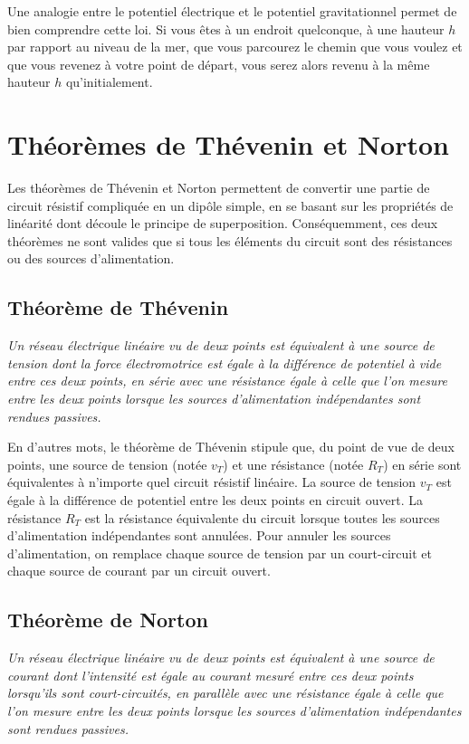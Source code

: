 \documentclass[12pt,oneside,letterpaper]{article}
\begin{document}
Une analogie entre le potentiel électrique et le potentiel gravitationnel permet de bien comprendre cette loi. Si vous êtes à un endroit quelconque, à une hauteur $h$ par rapport au niveau de la mer, que vous parcourez le chemin que vous voulez et que vous revenez à votre point de départ, vous serez alors revenu à la même hauteur $h$ qu'initialement.


\section{Théorèmes de Thévenin et Norton}

Les théorèmes de Thévenin et Norton permettent de convertir une partie de circuit résistif compliquée en un dipôle simple, en se basant sur les propriétés de linéarité dont découle le principe de superposition. Conséquemment, ces deux théorèmes ne sont valides que si tous les éléments du circuit sont des résistances ou des sources d'alimentation.


\subsection{Théorème de Thévenin}

\emph{Un réseau électrique linéaire vu de deux points est équivalent à une source de tension dont la force électromotrice est égale à la différence de potentiel à vide entre ces deux points, en série avec une résistance égale à celle que l'on mesure entre les deux points lorsque les sources d'alimentation indépendantes sont rendues passives.}

En d'autres mots, le théorème de Thévenin stipule que, du point de vue de deux points, une source de tension (notée $v_T$) et une résistance (notée $R_T$) en série sont équivalentes à n'importe quel circuit résistif linéaire. La source de tension $v_T$ est égale à la différence de potentiel entre les deux points en circuit ouvert. La résistance $R_T$ est la résistance équivalente du circuit lorsque toutes les sources d'alimentation indépendantes sont annulées. Pour annuler les sources d'alimentation, on remplace chaque source de tension par un court-circuit et chaque source de courant par un circuit ouvert.


\subsection{Théorème de Norton}

\emph{Un réseau électrique linéaire vu de deux points est équivalent à une source de courant dont l'intensité est égale au courant mesuré entre ces deux points lorsqu'ils sont court-circuités, en parallèle avec une résistance égale à celle que l'on mesure entre les deux points lorsque les sources d'alimentation indépendantes sont rendues passives.}
\end{document}

